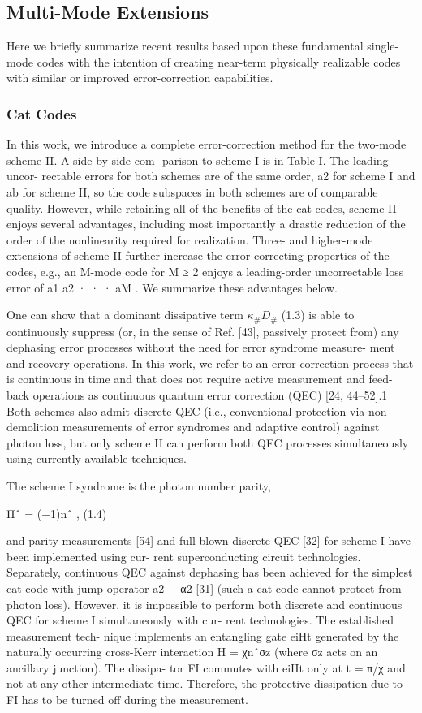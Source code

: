 \documentclass[12]{amsart}
\newcommand\0{\mathbf{0}}
\newcommand\<{\langle}
\renewcommand\>{\rangle}
\begin{document}
\subsection{Multi-Mode Extensions}

Here we briefly summarize recent results based upon these fundamental single-mode codes with the intention of creating near-term physically realizable codes with similar or improved error-correction capabilities.

\subsubsection{Cat Codes}\label{sec:multi-cat}

In this work, we introduce a complete error-correction method for the two-mode scheme II. A side-by-side com- parison to scheme I is in Table I. The leading uncor- rectable errors for both schemes are of the same order, a2 for scheme I and ab for scheme II, so the code subspaces in both schemes are of comparable quality. However, while retaining all of the benefits of the cat codes, scheme II enjoys several advantages, including most importantly a drastic reduction of the order of the nonlinearity required for realization. Three- and higher-mode extensions of scheme II further increase the error-correcting properties of the codes, e.g., an M-mode code for M ≥ 2 enjoys a leading-order uncorrectable loss error of a1 a2 · · · aM . We summarize these advantages below.

One can show that a dominant dissipative term $\kappa_\# D_\#$ (1.3) is able to continuously suppress (or, in the sense of Ref. [43], passively protect from) any dephasing error processes without the need for error syndrome measure- ment and recovery operations. In this work, we refer to an error-correction process that is continuous in time and that does not require active measurement and feed- back operations as continuous quantum error correction (QEC) [24, 44–52].1 Both schemes also admit discrete QEC (i.e., conventional protection via non-demolition measurements of error syndromes and adaptive control) against photon loss, but only scheme II can perform both QEC processes simultaneously using currently available techniques.

The scheme I syndrome is the photon number parity,

Πˆ = (−1)nˆ , (1.4)

and parity measurements [54] and full-blown discrete QEC [32] for scheme I have been implemented using cur- rent superconducting circuit technologies. Separately, continuous QEC against dephasing has been achieved for the simplest cat-code with jump operator a2 − α2 [31] (such a cat code cannot protect from photon loss). However, it is impossible to perform both discrete and continuous QEC for scheme I simultaneously with cur- rent technologies. The established measurement tech- nique implements an entangling gate eiHt generated by the naturally occurring cross-Kerr interaction H = χnˆσz (where σz acts on an ancillary junction). The dissipa- tor FI commutes with eiHt only at t = π/χ and not at any other intermediate time. Therefore, the protective dissipation due to FI has to be turned off during the measurement.
\end{document}

